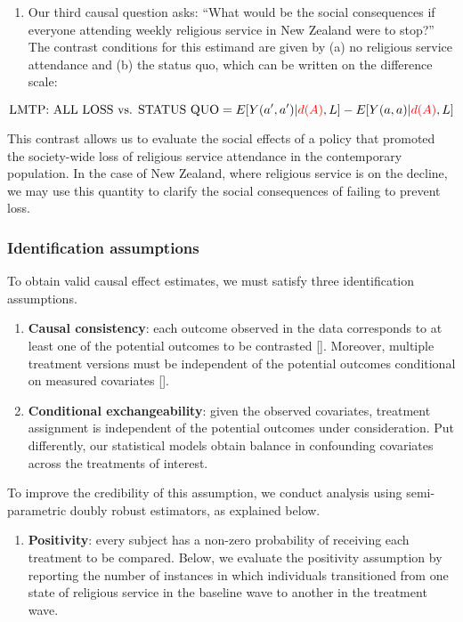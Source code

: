 \documentclass[
  single column]{article}
\providecommand{\tightlist}{%
  \setlength{\itemsep}{0pt}\setlength{\parskip}{0pt}}\usepackage{longtable,booktabs,array}
\begin{document}
\begin{enumerate}
\def\labelenumi{\arabic{enumi}.}
\setcounter{enumi}{1}
\tightlist
\item
  Our third causal question asks: ``What would be the social
  consequences if everyone attending weekly religious service in New
  Zealand were to stop?'' The contrast conditions for this estimand are
  given by (a) no religious service attendance and (b) the status quo,
  which can be written on the difference scale:
\end{enumerate}

\[ \text{LMTP: ALL LOSS vs. STATUS QUO}  = E[Y(a^\prime,a^\prime)|\textcolor{red}{d(A)},L] - E[Y(a,a)|\textcolor{red}{d(A)},L] \]

This contrast allows us to evaluate the social effects of a policy that
promoted the society-wide loss of religious service attendance in the
contemporary population. In the case of New Zealand, where religious
service is on the decline, we may use this quantity to clarify the
social consequences of failing to prevent loss.

\subsubsection{Identification
assumptions}\label{identification-assumptions}

To obtain valid causal effect estimates, we must satisfy three
identification assumptions.

\begin{enumerate}
\def\labelenumi{\arabic{enumi}.}
\item
  \textbf{Causal consistency}: each outcome observed in the data
  corresponds to at least one of the potential outcomes to be contrasted
  {[}{]}. Moreover, multiple treatment versions must be independent of
  the potential outcomes conditional on measured covariates {[}{]}.
\item
  \textbf{Conditional exchangeability}: given the observed covariates,
  treatment assignment is independent of the potential outcomes under
  consideration. Put differently, our statistical models obtain balance
  in confounding covariates across the treatments of interest.
\end{enumerate}

To improve the credibility of this assumption, we conduct analysis using
semi-parametric doubly robust estimators, as explained below.

\begin{enumerate}
\def\labelenumi{\arabic{enumi}.}
\setcounter{enumi}{2}
\tightlist
\item
  \textbf{Positivity}: every subject has a non-zero probability of
  receiving each treatment to be compared. Below, we evaluate the
  positivity assumption by reporting the number of instances in which
  individuals transitioned from one state of religious service in the
  baseline wave to another in the treatment wave.
\end{enumerate}
\end{document}
